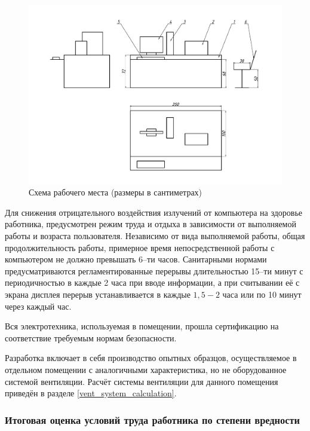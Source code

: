 \begin{figure}[ht!]
    \centering
    \includegraphics[width=\textwidth, keepaspectratio, clip=true, trim=0mm 10mm 0mm 15mm]
                    {./src/ecology/pictures/workplace_scheme}
    \caption{Схема рабочего места (размеры в сантиметрах)}
    \label{pic_workplace_scheme}
\end{figure}

Для снижения отрицательного воздействия излучений от компьютера
на здоровье работника, предусмотрен режим труда и отдыха в зависимости от выполняемой
работы и возраста пользователя. Независимо от вида выполняемой работы, общая
продолжительность работы, примерное время непосредственной работы с компьютером
не должно превышать 6--ти часов. Санитарными нормами предусматриваются регламентированные
перерывы длительностью 15--ти минут с периодичностью в каждые 2 часа при вводе
информации, а при считывании её с экрана дисплея перерыв устанавливается в
каждые $1,5 - 2$ часа или по 10 минут через каждый час.

Вся электротехника, используемая в помещении, прошла сертификацию на соответствие
требуемым нормам безопасности.

Разработка включает в себя производство опытных образцов, осуществляемое в отдельном
помещении с аналогичными характеристика, но не оборудованное системой вентиляции.
Расчёт системы вентиляции для данного помещения приведён в разделе \ref{vent_system_calculation}.



\subsubsection{Итоговая оценка условий труда работника по степени вредности}

